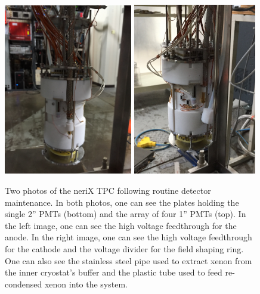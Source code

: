 \begin{figure}[t]
        \centering
	\includegraphics[width=0.50\textwidth]{nerix_tpc_anode}
	\includegraphics[width=0.48\textwidth]{nerix_tpc_cathode}
	\caption{Two photos of the neriX TPC following routine detector maintenance.  In both photos, one can see the plates holding the single 2'' PMTs (bottom) and the array of four 1'' PMTs (top).  In the left image, one can see the high voltage feedthrough for the anode.  In the right image, one can see the high voltage feedthrough for the cathode and the voltage divider for the field shaping ring.  One can also see the stainless steel pipe used to extract xenon from the inner cryostat's buffer and the plastic tube used to feed re-condensed xenon into the system.}
	\label{fig:nerix_tpc}
\end{figure}



